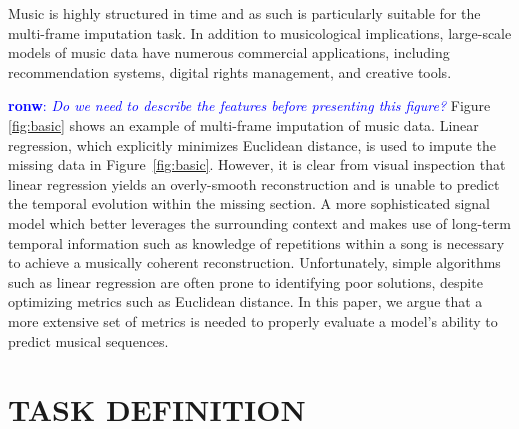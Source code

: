 \documentclass{article}
\newcommand{\FIXME}[2][FIXME]{\textcolor{blue}{\textbf{#1}: \emph{#2}}}
\begin{document}

Music is highly structured in time and as such is particularly suitable
for the multi-frame imputation task.
In addition to musicological implications,
large-scale models of music data have numerous commercial
applications, including recommendation systems, digital rights
management, and creative tools.  

\FIXME[ronw]{Do we need to describe the features before presenting
  this figure?}  
Figure \ref{fig:basic} shows an example of
multi-frame imputation of music data.  Linear regression, which
explicitly minimizes Euclidean distance, is used to impute the missing
data in Figure~\ref{fig:basic}.  However, it is clear from visual
inspection that linear regression yields an overly-smooth
reconstruction and is unable to predict the temporal evolution within
the missing section.
%
A more sophisticated signal model which better leverages the
surrounding context and makes use of long-term temporal information
such as knowledge of repetitions within a song is necessary to achieve
a musically coherent reconstruction.
%
Unfortunately, simple algorithms such as linear regression
are often prone to identifying poor solutions, despite optimizing
metrics such as Euclidean distance.
%
In this paper, we argue that a more extensive set of metrics is needed
to properly evaluate a model's ability to predict musical sequences.


\section{TASK DEFINITION}
\label{sec:task}
\end{document}
